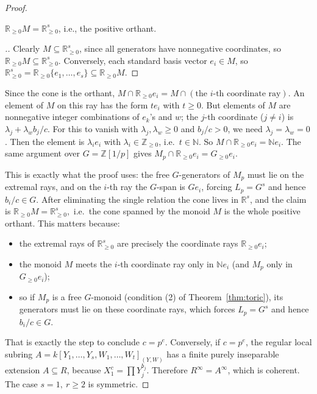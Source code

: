\documentclass[11pt,a4paper]{amsart}
\numberwithin{equation}{section}
\newenvironment{PROOF}[2][\proofname.]
{\begin{proof}[#1]\renewcommand{\qedsymbol}{\textsquare$_{\rm #2}$}}
	{\end{proof}}
\begin{document}
\begin{proof}
\begin{claim}\label{po}	\(\mathbb{R}_{\ge0}M=\mathbb{R}_{\ge0}^s\), i.e., the positive orthant.
\end{claim}

\begin{PROOF}{\ref{po}}	Clearly \(M\subseteq \mathbb{R}_{\ge0}^s\), since all generators have nonnegative coordinates, so \(\mathbb{R}_{\ge0}M\subseteq\mathbb{R}_{\ge0}^s\). Conversely, each standard basis vector \(e_i\in M\), so \(\mathbb{R}_{\ge0}^s=\mathbb{R}_{\ge0}\{e_1,\dots,e_s\}\subseteq\mathbb{R}_{\ge0}M\). 
\end{PROOF}

 Since the cone is the orthant,
$M\cap\mathbb{R}_{\ge0}e_i = M\cap(\text{the }i\text{-th coordinate ray}).$ An element of \(M\) on this ray has the form \(t e_i\) with \(t\ge0\). But elements of \(M\) are nonnegative integer combinations of \(e_k\)'s and \(w\); the \(j\)-th coordinate (\(j\ne i\)) is \(\lambda_j + \lambda_w b_j/c\). For this to vanish with \(\lambda_j,\lambda_w\ge0\) and \(b_j/c>0\), we need \(\lambda_j=\lambda_w=0\). Then the element is \(\lambda_i e_i\) with \(\lambda_i\in\mathbb{Z}_{\ge0}\), i.e.\ \(t\in\mathbb{N}\). So \(M\cap\mathbb{R}_{\ge0}e_i=\mathbb{N} e_i\). The same argument over \(G=\mathbb{Z}[1/p]\) gives \(M_p\cap\mathbb{R}_{\ge0}e_i=G_{\ge0}e_i\).

This is exactly what the proof uses: the free \(G\)-generators of \(M_p\) must lie on the extremal rays, and on the \(i\)-th ray the \(G\)-span is \(G e_i\), forcing \(L_p=G^s\) and hence \(b_i/c\in G\).
After eliminating the single relation the cone lives in \(\mathbb{R}^s\), and the claim is
$\mathbb{R}_{\ge0}M=\mathbb{R}_{\ge0}^s,$
i.e.\ the cone spanned by the monoid \(M\) is the whole positive orthant. This matters because:
\begin{itemize}
\item the extremal rays of \(\mathbb{R}_{\ge0}^s\) are precisely the coordinate rays \(\mathbb{R}_{\ge0}e_i\);
\item the monoid \(M\) meets the \(i\)-th coordinate ray only in \(\mathbb{N}e_i\) (and \(M_p\) only in \(G_{\ge0}e_i\));
\item so if \(M_p\) is a free \(G\)-monoid (condition (2) of Theorem~\ref{thm:toric}), its generators must lie on these coordinate rays, which forces \(L_p=G^s\) and hence \(b_i/c\in G\).
\end{itemize}
That is exactly the step   to conclude \(c=p^e\).
Conversely, if $c=p^e$, the regular local subring
 $	A=k[Y_1,\ldots,Y_s,W_1,\ldots,W_t]_{(Y,W)} $	has a finite purely inseparable extension $A\subseteq R$, because
 $X_1^c=\prod Y_j^{b_j}$. Therefore	$R^\infty=A^\infty$, which is coherent.	The case $s=1,\ r\geq2$ is symmetric.
 	

\end{proof}
\end{document}
